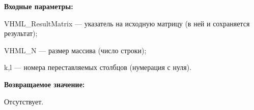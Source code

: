 \textbf{Входные параметры:} 
 
VHML\_ResultMatrix --- указатель на исходную матрицу (в ней и сохраняется результат);
 
VHML\_N --- размер массива (число строки);
 
k,l --- номера переставляемых столбцов (нумерация с нуля).

\textbf{Возвращаемое значение:}

Отсутствует.
